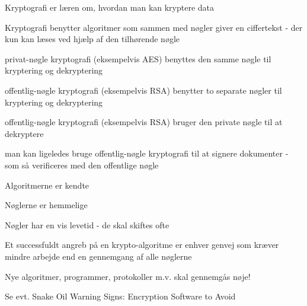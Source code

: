 

\begin{list1}
\item Kryptografi er læren om, hvordan man kan kryptere data
\item Kryptografi benytter algoritmer som sammen med nøgler giver en
  ciffertekst - der kun kan læses ved hjælp af den tilhørende nøgle
\end{list1}



\begin{list1}
\item privat-nøgle kryptografi (eksempelvis AES) benyttes den samme
  nøgle til kryptering og dekryptering 
\item offentlig-nøgle kryptografi (eksempelvis RSA) benytter to
  separate nøgler til kryptering og dekryptering
\end{list1}



\begin{list1}

\item offentlig-nøgle kryptografi (eksempelvis RSA) bruger den private
  nøgle til at dekryptere
\item man kan ligeledes bruge offentlig-nøgle kryptografi til at
  signere dokumenter - som så verificeres med den offentlige nøgle
\end{list1}



\begin{list1}
\item Algoritmerne er kendte
\item Nøglerne er hemmelige
\item Nøgler har en vis levetid - de skal skiftes ofte
\item Et successfuldt angreb på en krypto-algoritme er enhver genvej
  som kræver mindre arbejde end en gennemgang af alle nøglerne 
\item Nye algoritmer, programmer, protokoller m.v. skal gennemgås nøje!
\item Se evt. Snake Oil Warning Signs:
Encryption Software to Avoid 
\end{list1}

